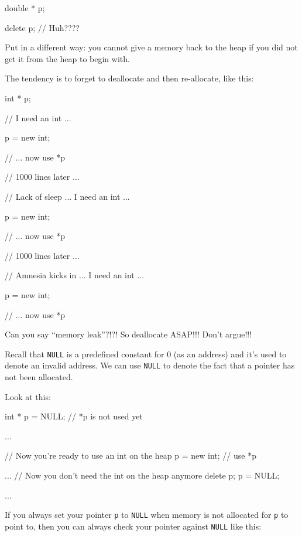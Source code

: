 \begin{consolethree}[escapeinside=||]
double * p;

delete p; // Huh????
\end{consolethree}
Put in a different way: you cannot give a memory back to the heap if you did not get it from the heap to begin with.

The tendency is to forget to deallocate and then re-allocate, like this:

\begin{consolethree}[escapeinside=||]
int * p;

// I need an int ...

p = new int;

// ... now use *p

// 1000 lines later ...

// Lack of sleep ... I need an int ...

p = new int;

// ... now use *p

// 1000 lines later ...

// Amnesia kicks in ... I need an int ...

p = new int;

// ... now use *p
\end{consolethree}
Can you say ``memory leak''?!?! So deallocate ASAP!!! Don't argue!!!





\newpage{}

Recall that \texttt{NULL} is a predefined constant for 0 (as an address)
and it's used to denote an invalid address. We can use \texttt{NULL} to
denote the fact that a pointer has not been allocated.

Look at this:

\begin{consolethree}[escapeinside=||]
int * p = NULL;
// *p is not used yet

...

// Now you're ready to use an int on the heap
p = new int;
// use *p

...
// Now you don't need the int on the heap anymore
delete p;
p = NULL;

...
\end{consolethree}
If you always set your pointer \texttt{p} to \texttt{NULL} when memory is not allocated for \texttt{p} to point to, then you can always check your pointer against \texttt{NULL} like this:

